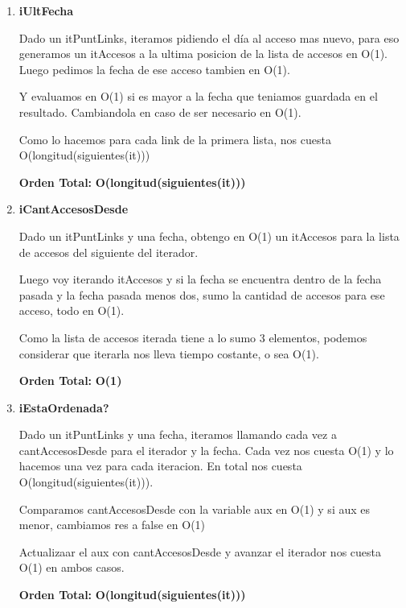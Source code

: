 \begin{enumerate}
\item\textbf{iUltFecha}
\par Dado un itPuntLinks, iteramos pidiendo el día al acceso mas nuevo, para eso generamos un itAccesos a la ultima posicion de la lista de accesos en O(1). Luego pedimos la fecha de ese acceso tambien en O(1).
\par Y evaluamos en O(1) si es mayor a la fecha que teniamos guardada en el resultado. Cambiandola en caso de ser necesario en O(1).
\par Como lo hacemos para cada link de la primera lista, nos cuesta O(longitud(siguientes(it)))
\par \textbf{Orden Total:} \textbf{O(longitud(siguientes(it)))}

\item\textbf{iCantAccesosDesde}
\par Dado un itPuntLinks y una fecha, obtengo en O(1) un itAccesos para la lista de accesos del siguiente del iterador.
\par Luego voy iterando itAccesos y si la fecha se encuentra dentro de la fecha pasada y la fecha pasada menos dos, sumo la cantidad de accesos para ese acceso, todo en O(1).
\par Como la lista de accesos iterada tiene a lo sumo 3 elementos, podemos considerar que iterarla nos lleva tiempo costante, o sea O(1).
\par \textbf{Orden Total:} \textbf{O(1)}

\item\textbf{iEstaOrdenada?}
\par Dado un itPuntLinks y una fecha, iteramos llamando cada vez a cantAccesosDesde para el iterador y la fecha. Cada vez nos cuesta O(1) y lo hacemos una vez para cada iteracion. En total nos cuesta O(longitud(siguientes(it))).
\par Comparamos cantAccesosDesde con la variable aux en O(1) y si aux es menor, cambiamos res a false en O(1)
\par Actualizaar el aux con cantAccesosDesde y avanzar el iterador nos cuesta O(1) en ambos casos.
\par \textbf{Orden Total:} \textbf{O(longitud(siguientes(it)))}

\end{enumerate}